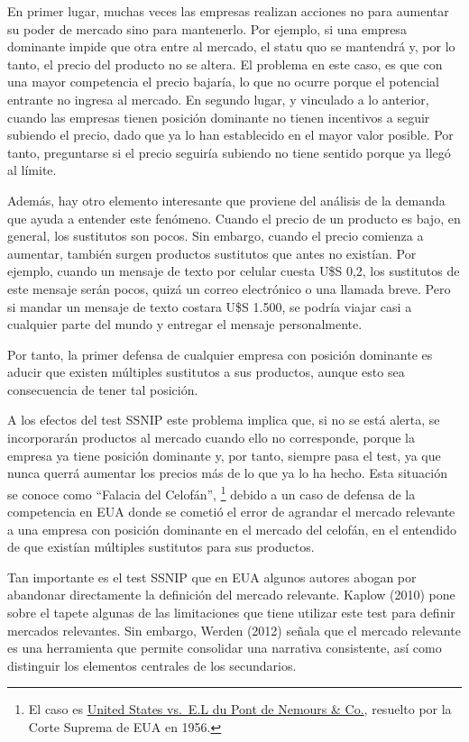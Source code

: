 \documentclass[
  12pt,
  spanish,
]{book}
\begin{document}
En primer lugar, muchas veces las empresas realizan acciones no para aumentar su poder de mercado sino para mantenerlo. Por ejemplo, si una empresa dominante impide que otra entre al mercado, el statu quo se mantendrá y, por lo tanto, el precio del producto no se altera. El problema en este caso, es que con una mayor competencia el precio bajaría, lo que no ocurre porque el potencial entrante no ingresa al mercado. En segundo lugar, y vinculado a lo anterior, cuando las empresas tienen posición dominante no tienen incentivos a seguir subiendo el precio, dado que ya lo han establecido en el mayor valor posible. Por tanto, preguntarse si el precio seguiría subiendo no tiene sentido porque ya llegó al límite.

Además, hay otro elemento interesante que proviene del análisis de la demanda que ayuda a entender este fenómeno. Cuando el precio de un producto es bajo, en general, los sustitutos son pocos. Sin embargo, cuando el precio comienza a aumentar, también surgen productos sustitutos que antes no existían. Por ejemplo, cuando un mensaje de texto por celular cuesta U\$S 0,2, los sustitutos de este mensaje serán pocos, quizá un correo electrónico o una llamada breve. Pero si mandar un mensaje de texto costara U\$S 1.500, se podría viajar casi a cualquier parte del mundo y entregar el mensaje personalmente.

Por tanto, la primer defensa de cualquier empresa con posición dominante es aducir que existen múltiples sustitutos a sus productos, aunque esto sea consecuencia de tener tal posición.

A los efectos del test SSNIP este problema implica que, si no se está alerta, se incorporarán productos al
mercado cuando ello no corresponde, porque la empresa ya tiene posición dominante y, por tanto, siempre pasa el test, ya que nunca querrá aumentar los precios más de lo que ya lo ha hecho. Esta situación se conoce como ``Falacia
del Celofán'',
\footnote{El caso es \href{https://supreme.justia.com/cases/federal/us/351/377/}{United States vs.~E.L du Pont de Nemours \& Co.}, resuelto por la Corte Suprema de EUA en 1956.}
debido a un caso de defensa de la competencia en EUA donde se cometió el error de agrandar el mercado relevante a una empresa con posición dominante en el mercado del celofán, en el entendido de que existían múltiples sustitutos para sus productos.

Tan importante es el test SSNIP que en EUA algunos autores abogan por abandonar directamente la definición del mercado relevante. Kaplow (2010) pone sobre el tapete algunas de las limitaciones que tiene utilizar este test para definir mercados relevantes. Sin embargo, Werden (2012) señala que el mercado relevante es una herramienta que permite consolidar una narrativa consistente, así como distinguir los elementos centrales de los secundarios.
\end{document}
